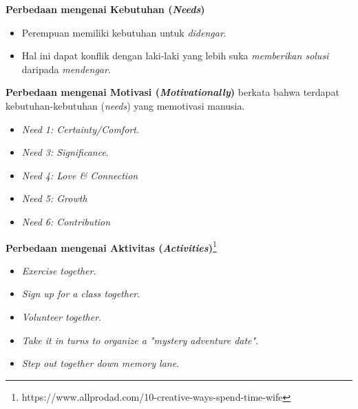 \documentclass{beamer}
\theoremstyle{mystyle}
\begin{document}
\begin{frame}{\textbf{Perbedaan mengenai Kebutuhan (\textit{Needs})}}
		\begin{itemize}
			\item Perempuan memiliki kebutuhan untuk \textit{didengar}.
			\hfill \break
			\item<2-> Hal ini dapat konflik dengan laki-laki yang lebih suka \textit{memberikan solusi} daripada \textit{mendengar}.
		\end{itemize}			
\end{frame}


\begin{frame}{\textbf{Perbedaan mengenai Motivasi (\textit{Motivationally})}}
	\citet{robbins-basic-needs-14} berkata bahwa terdapat kebutuhan-kebutuhan (\textit{needs}) yang memotivasi manusia.
	\begin{itemize}
		\item<2-> \textit{Need 1: Certainty/Comfort}.
		\hfill \break
		\item<3-> \textit{Need 3: Significance}.
		\hfill \break
		\item<4-> \textit{Need 4: Love \& Connection}
		\hfill \break
		\item<5-> \textit{Need 5: Growth}
		\hfill \break
		\item<6-> \textit{Need 6: Contribution}		
	\end{itemize}
\end{frame}

\begin{frame}{\textbf{Perbedaan mengenai Aktivitas (\textit{Activities})}\footnote{https://www.allprodad.com/10-creative-ways-spend-time-wife}}
	\begin{itemize}
		\item<2-> \textit{Exercise together}.
		\hfill \break
		\item<3-> \textit{Sign up for a class together}.
		\hfill \break
		\item<4-> \textit{Volunteer together}.
		\hfill \break
		\item<5-> \textit{Take it in turns to organize a "mystery adventure date"}.
		\hfill \break
		\item<6-> \textit{Step out together down memory lane}.
	\end{itemize}
\end{frame}
\end{document}
